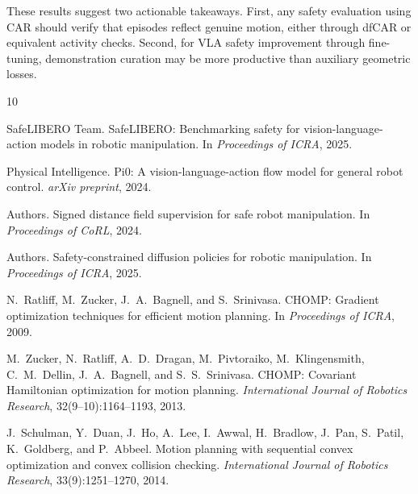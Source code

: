 \documentclass[10pt,letterpaper]{article}
\begin{document}
These results suggest two actionable takeaways. First, any safety evaluation using CAR should verify that episodes reflect genuine motion, either through dfCAR or equivalent activity checks. Second, for VLA safety improvement through fine-tuning, demonstration curation may be more productive than auxiliary geometric losses.

{\small

\begin{thebibliography}{10}

SafeLIBERO Team.
\newblock SafeLIBERO: Benchmarking safety for vision-language-action models in robotic manipulation.
\newblock In \emph{Proceedings of ICRA}, 2025.

Physical Intelligence.
\newblock Pi0: A vision-language-action flow model for general robot control.
\newblock \emph{arXiv preprint}, 2024.

{Authors}.
\newblock Signed distance field supervision for safe robot manipulation.
\newblock In \emph{Proceedings of CoRL}, 2024.

{Authors}.
\newblock Safety-constrained diffusion policies for robotic manipulation.
\newblock In \emph{Proceedings of ICRA}, 2025.

N.~Ratliff, M.~Zucker, J.~A.~Bagnell, and S.~Srinivasa.
\newblock CHOMP: Gradient optimization techniques for efficient motion planning.
\newblock In \emph{Proceedings of ICRA}, 2009.

M.~Zucker, N.~Ratliff, A.~D.~Dragan, M.~Pivtoraiko, M.~Klingensmith, C.~M.~Dellin, J.~A.~Bagnell, and S.~S.~Srinivasa.
\newblock CHOMP: Covariant Hamiltonian optimization for motion planning.
\newblock \emph{International Journal of Robotics Research}, 32(9--10):1164--1193, 2013.

J.~Schulman, Y.~Duan, J.~Ho, A.~Lee, I.~Awwal, H.~Bradlow, J.~Pan, S.~Patil, K.~Goldberg, and P.~Abbeel.
\newblock Motion planning with sequential convex optimization and convex collision checking.
\newblock \emph{International Journal of Robotics Research}, 33(9):1251--1270, 2014.


\end{thebibliography}}
\end{document}
